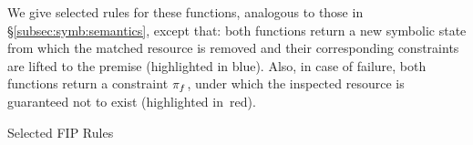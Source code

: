 \noindent We give selected rules for these functions, analogous to those in \S\ref{subsec:symb:semantics}, except that:  both functions return a new symbolic state 
from which the matched resource is removed and  their corresponding constraints are lifted to the premise (highlighted in blue). 
Also, in case of failure, both functions return a constraint $\pi_f$, under which the inspected resource is guaranteed not to exist (highlighted in~red). 

\smallskip
\begin{display}{Selected FIP Rules}
\end{display}
